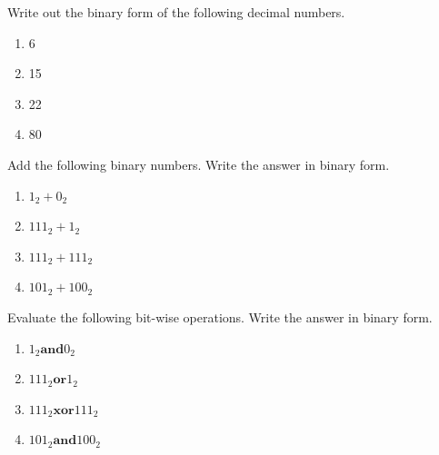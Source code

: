 \begin{exercise}
Write out the binary form of the following decimal numbers. 
\begin{enumerate}
\item 6
\item 15
\item 22
\item 80
\end{enumerate}
\end{exercise}

\begin{exercise}
Add the following binary numbers. Write the answer in binary form. 
\begin{enumerate}
\item $1_2 + 0_2$
\item $111_2+1_2$
\item $111_2+111_2$
\item $101_2+100_2$
\end{enumerate}
\end{exercise}

\begin{exercise}
Evaluate the following bit-wise operations. Write the answer in binary form. 
\begin{enumerate}
\item $1_2 \mathbf{and} 0_2$
\item $111_2 \mathbf{or} 1_2$
\item $111_2 \mathbf{xor} 111_2$
\item $101_2 \mathbf{and} 100_2$
\end{enumerate}
\end{exercise}
